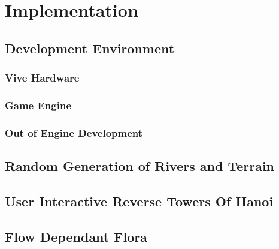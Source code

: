 \chapter{Implementation}
\label{chapter6}

\section{Development Environment}
\lipsum[1-1] \cite{parikh1980adaptive}

\subsection{Vive Hardware}
\lipsum[1-1] \cite{parikh1980adaptive}

\subsection{Game Engine}
\lipsum[1-1] \cite{parikh1980adaptive}

\subsection{Out of Engine Development}
\lipsum[1-1] \cite{parikh1980adaptive}

\section{Random Generation of Rivers and Terrain}
\lipsum[1-1] \cite{parikh1980adaptive}

\section{User Interactive Reverse Towers Of Hanoi}
\lipsum[1-1] \cite{parikh1980adaptive}

\section{Flow Dependant Flora}
\lipsum[1-1] \cite{parikh1980adaptive}